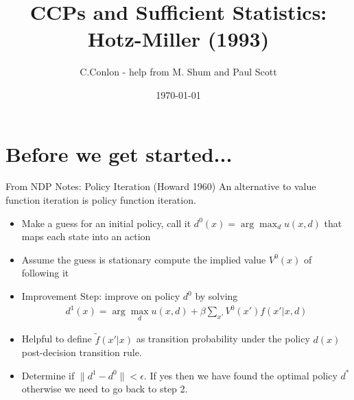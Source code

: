 \documentclass[aspectratio=169,11pt]{beamer}
\title{CCPs and Sufficient Statistics: Hotz-Miller (1993)}
\author{C.Conlon - help from M. Shum and Paul Scott}
\institute{Grad IO }
\date{\today}
\begin{document}
\begin{frame}
\titlepage
\end{frame}


\section{Before we get started...}

\begin{frame}{From NDP Notes: Policy Iteration (Howard 1960)}
An alternative to value function iteration is policy function iteration.
\begin{itemize}
\item Make a guess for an initial policy, call it $d^0(x) = \arg \max_d u(x,d)$ that maps each state into an action
\item Assume the guess is stationary compute the implied value $V^0(x)$ of following it
\item Improvement Step: improve on policy $d^0$ by solving
\begin{eqnarray*}
d^1(x) = \arg \max_d u(x,d) + \beta \sum_{x'} V^0(x') f (x' | x,d)
\end{eqnarray*}
\item Helpful to define $\tilde{f}(x' | x)$ as transition probability under the policy $d(x)$ \alert{post-decision transition rule}.
\item Determine if $\| d^1 -d^0\| < \epsilon$. If yes then we have found the optimal policy $d^* $ otherwise we need to go back to step 2.
\end{itemize}
\end{frame}
\end{document}
